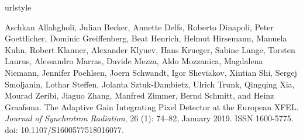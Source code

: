 \documentclass[a4paper]{article}
\begin{document}
\begin{thebibliography}{33}
\providecommand{\natexlab}[1]{#1}
\providecommand{\url}[1]{\texttt{#1}}
\expandafter\ifx\csname urlstyle\endcsname\relax
  \providecommand{\doi}[1]{doi: #1}\else
  \providecommand{\doi}{doi: \begingroup \urlstyle{rm}\Url}\fi

Aschkan Allahgholi, Julian Becker, Annette Delfs, Roberto Dinapoli, Peter
  Goettlicher, Dominic Greiffenberg, Beat Henrich, Helmut Hirsemann, Manuela
  Kuhn, Robert Klanner, Alexander Klyuev, Hans Krueger, Sabine Lange, Torsten
  Laurus, Alessandro Marras, Davide Mezza, Aldo Mozzanica, Magdalena Niemann,
  Jennifer Poehlsen, Joern Schwandt, Igor Sheviakov, Xintian Shi, Sergej
  Smoljanin, Lothar Steffen, Jolanta {Sztuk-Dambietz}, Ulrich Trunk, Qingqing
  Xia, Mourad Zeribi, Jiaguo Zhang, Manfred Zimmer, Bernd Schmitt, and Heinz
  Graafsma.
\newblock The {{Adaptive Gain Integrating Pixel Detector}} at the {{European
  XFEL}}.
\newblock \emph{Journal of Synchrotron Radiation}, 26 (1):
  74--82, January 2019.
\newblock ISSN 1600-5775.
\newblock \doi{10.1107/S1600577518016077}.


\end{thebibliography}
\end{document}
